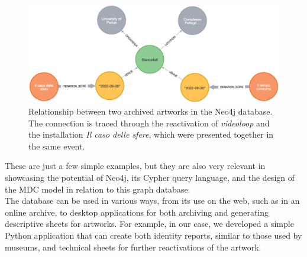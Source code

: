 \begin{figure}[!h]
    \centering
    \includegraphics[width=\linewidth]{chapters/4-MDC_model_application/image/neo4j-event.png}
    \caption{Relationship between two archived artworks in the Neo4j database. The connection is traced through the reactivation of \textit{videoloop} and the installation \textit{Il caso delle sfere}, which were presented together in the same event.}
    \label{fig:c4-neo4j-event}
\end{figure}

These are just a few simple examples, but they are also very relevant in showcasing the potential of Neo4j, its Cypher query language, and the design of the MDC model in relation to this graph database.\\
The database can be used in various ways, from its use on the web, such as in an online archive, to desktop applications for both archiving and generating descriptive sheets for artworks. For example, in our case, we developed a simple Python application that can create both identity reports, similar to those used by museums, and technical sheets for further reactivations of the artwork. 

